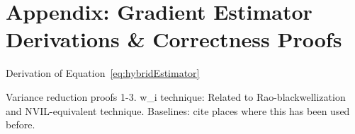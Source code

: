 \section{Appendix: Gradient Estimator Derivations \& Correctness Proofs}
\label{sec:appendix_proofs}

Derivation of Equation~\ref{eq:hybridEstimator}

Variance reduction proofs 1-3.
w_i technique: Related to Rao-blackwellization and NVIL-equivalent technique.
Baselines: cite places where this has been used before.